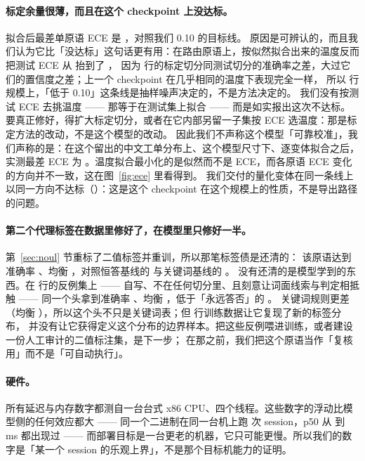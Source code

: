 \documentclass[11pt,a4paper]{article}
\begin{document}
\paragraph{标定余量很薄，而且在这个 checkpoint 上没达标。} 拟合后最差单原语 ECE 是 \WorstEce{}，对照我们 \num{0.10} 的目标线。
原因是可辨认的，而且我们认为它比「没达标」这句话更有用：在路由原语上，按似然拟合出来的温度反而把测试 ECE 从 \EceBeforeChoice{} 抬到了 \EceChoice{}，
因为 \RowsCalib{} 行的标定切分同测试切分的准确率之差，大过它们的置信度之差；上一个 checkpoint 在几乎相同的温度下表现完全一样，
所以 \RowsTest{} 行规模上，「低于 \num{0.10}」这条线是抽样噪声决定的，不是方法决定的。
我们没有按测试 ECE 去挑温度 —— 那等于在测试集上拟合 —— 而是如实报出这次不达标。
要真正修好，得扩大标定切分，或者在它内部另留一子集按 ECE 选温度：那是标定方法的改动，不是这个模型的改动。
因此我们不声称这个模型「可靠校准」，我们声称的是：在这个留出的中文工单分布上、这个模型尺寸下、逐变体拟合之后，
实测最差 ECE 为 \WorstEce{}。温度拟合最小化的是似然而不是 ECE，而各原语 ECE 变化的方向并不一致，这在图~\ref{fig:ece} 里看得到。
我们交付的量化变体在同一条线上以同一方向不达标（\EceWorstOnnx{}）：这是这个 checkpoint 在这个规模上的性质，不是导出路径的问题。

\paragraph{第二个代理标签在数据里修好了，在模型里只修好一半。} 第~\ref{sec:noul} 节重标了二值标签并重训，所以那笔标签债是还清的：
该原语达到准确率 \AccNoul{}、均衡 \BAccNoul{}，对照恒答基线的 \MajAccNoul{} 与关键词基线的 \RulesBAccNoul{}。
没有还清的是模型学到的东西。在 \AntibodyN{} 行的反例集上 —— 自写、不在任何切分里、且刻意让词面线索与判定相抵触 ——
同一个头拿到准确率 \AntibodyAcc{}、均衡 \AntibodyBAcc{}，低于「永远答否」的 \AntibodyMajAcc{}。
关键词规则更差（均衡 \AntibodyRulesBAcc{}），所以这个头不只是关键词表；但 \RowsTrain{} 行训练数据让它复现了新的标签分布，
并没有让它获得定义这个分布的边界样本。把这些反例喂进训练，或者建设一份人工审计的二值标注集，是下一步；
在那之前，我们把这个原语当作「复核用」而不是「可自动执行」。

\paragraph{硬件。} 所有延迟与内存数字都测自一台台式 x86 CPU、四个线程。这些数字的浮动比模型侧的任何效应都大 ——
同一个二进制在同一台机上跑 \LatSessions{} 次 session，p50 从 \LatPFiveZeroBest{} 到 \LatPFiveZeroWorst\,ms 都出现过 ——
而部署目标是一台更老的机器，它只可能更慢。所以我们的数字是「某一个 session 的乐观上界」，不是那个目标机能力的证明。
\end{document}

